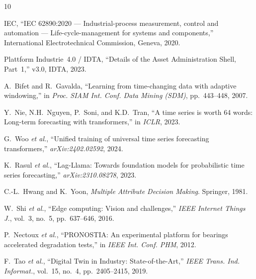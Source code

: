 \documentclass[12pt,a4paper]{article}
\begin{document}
\begin{thebibliography}{10}

IEC, ``IEC 62890:2020 --- Industrial-process measurement, control and
automation --- Life-cycle-management for systems and components,''
International Electrotechnical Commission, Geneva, 2020.

Plattform Industrie~4.0 / IDTA, ``Details of the Asset Administration
Shell, Part~1,'' v3.0, IDTA, 2023.

A.~Bifet and R.~Gavalda, ``Learning from time-changing data with
adaptive windowing,'' in \textit{Proc. SIAM Int. Conf. Data Mining
(SDM)}, pp.~443--448, 2007.

Y.~Nie, N.H.~Nguyen, P.~Soni, and K.D.~Tran, ``A time series is worth
64 words: Long-term forecasting with transformers,'' in
\textit{ICLR}, 2023.

G.~Woo \textit{et al.}, ``Unified training of universal time series
forecasting transformers,'' \textit{arXiv:2402.02592}, 2024.

K.~Rasul \textit{et al.}, ``Lag-Llama: Towards foundation models
for probabilistic time series forecasting,''
\textit{arXiv:2310.08278}, 2023.

C.-L.~Hwang and K.~Yoon, \textit{Multiple Attribute Decision Making}.
Springer, 1981.

W.~Shi \textit{et al.}, ``Edge computing: Vision and challenges,''
\textit{IEEE Internet Things J.}, vol.~3, no.~5, pp.~637--646, 2016.

P.~Nectoux \textit{et al.}, ``PRONOSTIA: An experimental platform
for bearings accelerated degradation tests,'' in \textit{IEEE Int.
Conf. PHM}, 2012.

F.~Tao \textit{et al.}, ``Digital Twin in Industry: State-of-the-Art,''
\textit{IEEE Trans. Ind. Informat.}, vol.~15, no.~4,
pp.~2405--2415, 2019.

\end{thebibliography}
\end{document}
